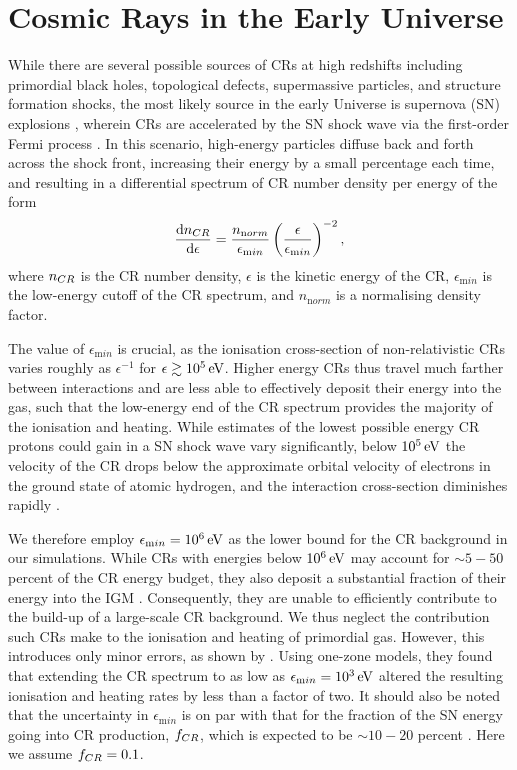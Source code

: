 \documentclass[../thesis.tex]{subfiles}
\begin{document}
\section{Cosmic Rays in the Early Universe}
\label{sec:context}
While there are several possible sources of CRs at high redshifts including primordial black holes, topological defects, supermassive particles, and structure formation shocks, the most likely source in the early Universe is supernova (SN) explosions \citep[e.g.,][]{GinzburgSyrovatskii1969,BiermannSigl2001,Stanev2004,Pfrommeretal2006}, wherein CRs are accelerated by the SN shock wave via the first-order Fermi process \citep[e.g.,][]{Bell1978}.  
In this scenario, high-energy particles diffuse back and forth across the shock front, increasing their energy by a small percentage each time, and resulting in a differential spectrum of CR number density per energy \citep{Longair1994} of the form
\begin{equation}
    \frac{{\mathrm d}n_{\mathrm \small CR}}{{\mathrm d}\epsilon} = \frac{n_{\mathrm norm}}{\epsilon_{\mathrm min}}
    \left( \frac{\epsilon}{\epsilon_{\mathrm min}} \right)^{-2},
\end{equation}
where $n_{\mathrm \small CR}$ is the CR number density, $\epsilon$ is the kinetic energy of the CR, $\epsilon_{\mathrm min}$ is the low-energy cutoff of the CR spectrum, and $n_{\mathrm norm}$ is a normalising density factor. 

The value of $\epsilon_{\mathrm min}$ is crucial, as the ionisation cross-section of non-relativistic CRs varies roughly as $\epsilon^{-1}$ for $\epsilon \gtrsim 10^5\,\mathrm{eV}$. 
Higher energy CRs thus travel much farther between interactions and are less able to effectively deposit their energy into the gas, such that the low-energy end of the CR spectrum provides the majority of the ionisation and heating.  
While estimates of the lowest possible energy CR protons could gain in a SN shock wave vary significantly, below $10^5\,\mathrm{eV}$ the velocity of the CR drops below the approximate orbital velocity of electrons in the ground state of atomic hydrogen, and the interaction cross-section diminishes rapidly \citep{Schlickeiser2002}. 

We therefore employ $\epsilon_{\mathrm min} = 10^6\,\mathrm{eV}$ as the lower bound for the CR background in our simulations.  
While CRs with energies below $10^6\,\mathrm{eV}$ may account for $\sim$$5-50$ percent of the CR energy budget, they also deposit a substantial fraction of their energy into the IGM \citep{SazonovSunyaev2015}. 
Consequently, they are unable to efficiently contribute to the build-up of a large-scale CR background. We thus neglect the contribution such CRs make to the ionisation and heating of primordial gas. 
However, this introduces only minor errors, as shown by \citet{StacyBromm2007}. Using one-zone models, they found that extending the CR spectrum to as low as $\epsilon_{\mathrm min} = 10^3\,\mathrm{eV}$ altered the resulting ionisation and heating rates by less than a factor of two.  
It should also be noted that the uncertainty in $\epsilon_{\mathrm min}$ is on par with that for the fraction of the SN energy going into CR production, $f_{\mathrm \small CR}$, which is expected to be $\sim$$10-20$ percent \citep{CaprioliSpitkovsky2014}.  
Here we assume $f_{\mathrm \small CR} = 0.1$.
\end{document}

